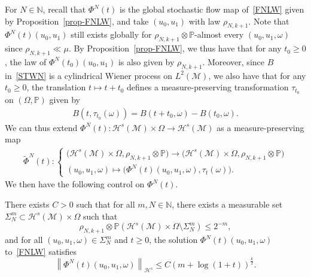 \documentclass[AHL,Unicode,longabstracts,published]{cedram}
\newcommand{\Prob}{\mathbb{P}}
\newcommand{\N}{\mathbb{N}}
\newcommand{\M}{\mathcal{M}}
\renewcommand{\H}{\mathcal{H}}
\newcommand{\Si}{\Sigma}
\newcommand{\wt}{\widetilde}
\renewcommand{\o}{\omega}
\renewcommand{\O}{\Omega}
\begin{document}
For $N\in\N$, recall that $\Phi^N(t)$ is the global stochastic flow map of~\eqref{FNLW} given by Proposition~\ref{prop-FNLW}, and take $(u_0,u_1)$ with law $\rho_{N,k+1}$. Note that $\Phi^N(t)(u_0,u_1)$ still exists globally for $\rho_{N,k+1}\otimes\Prob$-almost every $(u_0,u_1,\o)$ since $\rho_{N,k+1}\ll\mu$. By Proposition~\ref{prop-FNLW}, we thus have that for any $t_0\ge 0$, the law of $\Phi^N(t_0)(u_0,u_1)$ is also given by $\rho_{N,k+1}$. Moreover, since $B$ in~\eqref{STWN} is a cylindrical Wiener process on $L^2(\M)$, we also have that for any $t_0\ge 0$, the translation $t\mapsto t+t_0$ defines a measure-preserving transformation $\tau_{t_0}$ on $(\O,\Prob)$ given by
\begin{align}\label{Markov}
B(t,\tau_{t_0}(\o))= B(t+t_0,\o)-B(t_0,\o).
\end{align}
We can thus extend $\Phi^N(t):\H^s(\M)\times \O\to \H^s(\M)$ as a measure-preserving map
\begin{align*}
\wt\Phi^N(t):
\begin{cases}
\big(\H^s(\M)\times \O,\rho_{N,k+1}\otimes\Prob\big) \to \big(\H^s(\M)\times \O,\rho_{N,k+1}\otimes\Prob\big)\\
(u_0,u_1,\o)\mapsto \big(\Phi^N(t)(u_0,u_1,\o),\tau_t(\o)\big).
\end{cases}
\end{align*}
We then have the following control on $\Phi^N(t)$.

\begin{prop}\label{prop-Si}
There exists $C>0$ such that for all $m,N\in\N$, there exists a measurable set $\Si_N^{m}\subset \H^s(\M)\times\O$ such that
\begin{equation}\label{measure-Si}
\rho_{N,k+1}\otimes\Prob\left(\H^s(\M)\times\O\setminus\Si_N^{m}\right)\leq 2^{-m},
\end{equation}
and for all $(u_0,u_1,\o)\in\Si_N^{m}$ and $t\ge 0$, the solution $\Phi^N(t)(u_0,u_1,\o)$ to~\eqref{FNLW} satisfies
\begin{equation}\label{estim-Si}
\left\|\Phi^N(t)(u_0,u_1,\o)\right\|_{\H^{s}} \leq C\left(m+\log(1+t)\right)^{\frac{k}2}.
\end{equation}
\end{prop}
\end{document}
